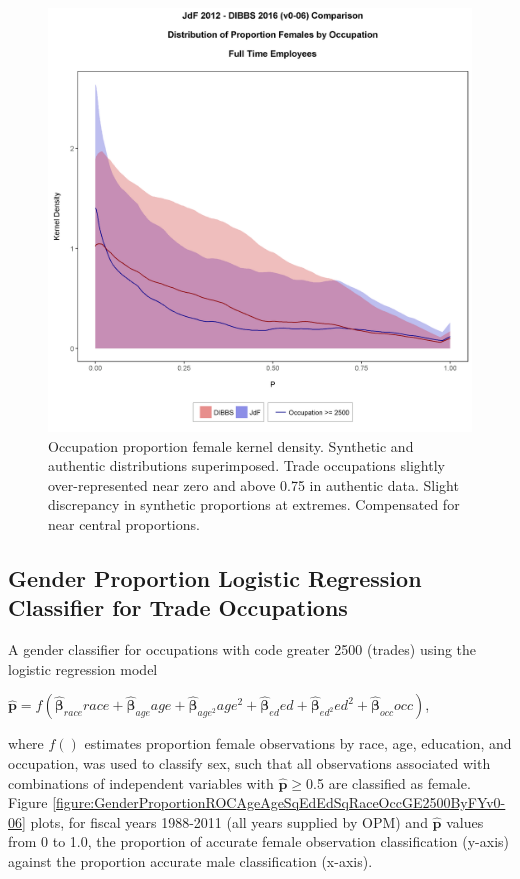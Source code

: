 \documentclass[10pt, letterpaper]{article}
\newcommand{\mest}[1]{\hat{\bm{#1}}}
\begin{document}
\begin{spacing}{1.0}
\begin{figure}[h]
    \centering
    \includegraphics[width=6in, trim={0 0 0 1in}, clip]{JdFDIBBSProportionFemaleDistributionByOccupation-v0-06.png}
    \caption{Occupation proportion female kernel density.  Synthetic and authentic distributions superimposed.  Trade occupations slightly over-represented near zero and above 0.75 in authentic data.  Slight discrepancy in synthetic proportions at extremes.  Compensated for near central proportions.}
    \label{figure:JdFDIBBSProportionFemaleDistributionByOccupation-v0-06}
\end{figure}

\clearpage

\subsection{Gender Proportion Logistic Regression Classifier for Trade Occupations}

A gender classifier for occupations with code greater 2500 (trades) using the logistic regression model
\begin{center} $\mest{p}=f(\mest{\beta}_{race}race+\mest{\beta}_{age}age+\mest{\beta}_{age^2}age^2+
    \mest{\beta}_{ed}ed+\mest{\beta}_{ed^2}ed^2+\mest{\beta}_{occ}occ)$,\\
\end{center}
where $f()$ estimates proportion female observations by race, age, education, and occupation, was used to classify sex, such that all observations associated with combinations of independent variables with $\mest{p}\ge$0.5 are classified as female.  Figure \ref{figure:GenderProportionROCAgeAgeSqEdEdSqRaceOccGE2500ByFYv0-06} plots, for fiscal years 1988-2011 (all years supplied by OPM) and $\mest{p}$ values from 0 to 1.0, the proportion of accurate female observation classification (y-axis) against the proportion accurate male classification (x-axis).\\


\end{spacing}
\end{document}
